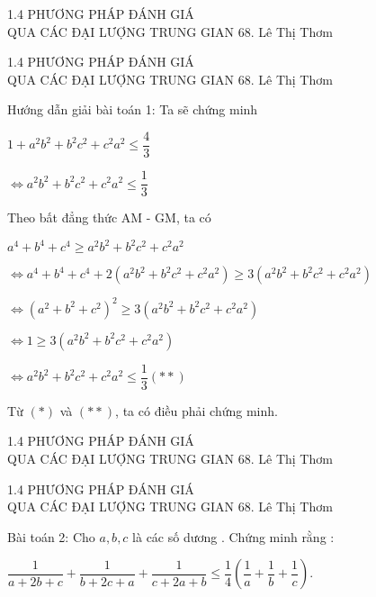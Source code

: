 \begin{frame}{1.4 PHƯƠNG PHÁP ĐÁNH GIÁ\\ QUA CÁC ĐẠI LƯỢNG TRUNG GIAN \hspace{3cm}  68. Lê Thị Thơm}

\end{frame}

\begin{frame}{1.4 PHƯƠNG PHÁP ĐÁNH GIÁ\\ QUA CÁC ĐẠI LƯỢNG TRUNG GIAN \hspace{3cm}  68. Lê Thị Thơm}
\begin{block}{Hướng dẫn giải bài toán 1:}
Ta sẽ chứng minh 

$1+ a^2b^2 + b^2c^2 + c^2a^2 \leq \dfrac{4}{3}$ 

$\Leftrightarrow a^2b^2 + b^2c^2 + c^2a^2  \leq \dfrac{1}{3}$

Theo bất đẳng thức AM - GM, ta có  

$a^4 + b^4 +c^4 \geqslant a^2b^2 + b^2c^2 + c^2a^2 $

$\Leftrightarrow a^4 + b^4 +c^4 + 2( a^2b^2 + b^2c^2 + c^2a^2) \geqslant 3(a^2b^2 + b^2c^2 + c^2a^2) $

$\Leftrightarrow (a^2 + b^2  + c^2 )^2 \geqslant 3(a^2b^2 + b^2c^2 + c^2a^2) $

$\Leftrightarrow 1 \geqslant 3(a^2b^2 + b^2c^2 + c^2a^2)  $

$\Leftrightarrow a^2b^2 + b^2c^2 + c^2a^2  \leq \dfrac{1}{3}      (**)$ 

Từ $(*)$ và $(**)$, ta có điều phải chứng minh.
\end{block}
\end{frame}

\begin{frame}{1.4 PHƯƠNG PHÁP ĐÁNH GIÁ\\ QUA CÁC ĐẠI LƯỢNG TRUNG GIAN \hspace{3cm}  68. Lê Thị Thơm} 
 
\end{frame}

\begin{frame}{1.4 PHƯƠNG PHÁP ĐÁNH GIÁ\\ QUA CÁC ĐẠI LƯỢNG TRUNG GIAN \hspace{3cm}  68. Lê Thị Thơm} 
\begin{block}{Bài toán 2:}
 Cho $a, b,c $ là các số dương . Chứng minh rằng :
 
$ \dfrac{1}{a + 2b + c} + \dfrac{1}{b + 2c + a} + \dfrac{1}{c + 2a + b} \leq \dfrac{1}{4}  ( \dfrac{1}{a} + \dfrac{1}{b} + \dfrac{1}{c})  .$
 
\end{block} 
\end{frame}

